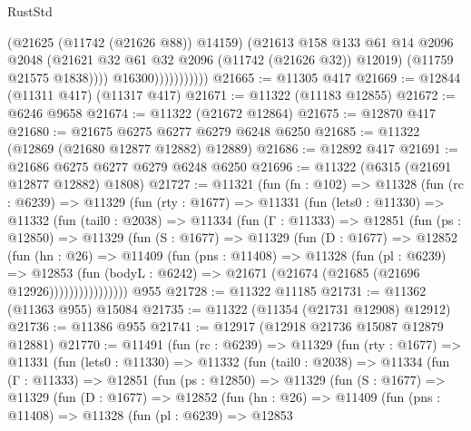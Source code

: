 \begin{lexlean}{RustStd}
\begin{coremodule}
                              (@21625 (@11742 (@21626 @88)) @14159)
                              (@21613
                                @158
                                @133
                                @61
                                @14
                                @2096
                                @2048
                                (@21621 @32 @61 @32 @2096 (@11742 (@21626 @32)) @12019)
                                (@11759 @21575 @1838))))
                          @16300)))))))))))
@21665 := @11305 @417
@21669 := @12844 (@11311 @417) (@11317 @417)
@21671 := @11322 (@11183 @12855)
@21672 := @6246 @9658
@21674 := @11322 (@21672 @12864)
@21675 := @12870 @417
@21680 := @21675 @6275 @6277 @6279 @6248 @6250
@21685 := @11322 (@12869 (@21680 @12877 @12882) @12889)
@21686 := @12892 @417
@21691 := @21686 @6275 @6277 @6279 @6248 @6250
@21696 := @11322 (@6315 (@21691 @12877 @12882) @1808)
@21727 := @11321
    (fun (fn : @102) =>
    @11328
      (fun (rc : @6239) =>
      @11329
        (fun (rty : @1677) =>
        @11331
          (fun (lets0 : @11330) =>
          @11332
            (fun (tail0 : @2038) =>
            @11334
              (fun (Γ : @11333) =>
              @12851
                (fun (ps : @12850) =>
                @11329
                  (fun (S : @1677) =>
                  @11329
                    (fun (D : @1677) =>
                    @12852
                      (fun (hn : @26) =>
                      @11409
                        (fun (pns : @11408) =>
                        @11328
                          (fun (pl : @6239) =>
                          @12853
                            (fun (bodyL : @6242) =>
                            @21671 (@21674 (@21685 (@21696 @12926))))))))))))))))
    @955
@21728 := @11322 @11185
@21731 := @11362 (@11363 @955) @15084
@21735 := @11322 (@11354 (@21731 @12908) @12912)
@21736 := @11386 @955
@21741 := @12917 (@12918 @21736 @15087 @12879 @12881)
@21770 := @11491
    (fun (rc : @6239) =>
    @11329
      (fun (rty : @1677) =>
      @11331
        (fun (lets0 : @11330) =>
        @11332
          (fun (tail0 : @2038) =>
          @11334
            (fun (Γ : @11333) =>
            @12851
              (fun (ps : @12850) =>
              @11329
                (fun (S : @1677) =>
                @11329
                  (fun (D : @1677) =>
                  @12852
                    (fun (hn : @26) =>
                    @11409
                      (fun (pns : @11408) =>
                      @11328
                        (fun (pl : @6239) =>
                        @12853

\end{coremodule}
\end{lexlean}
